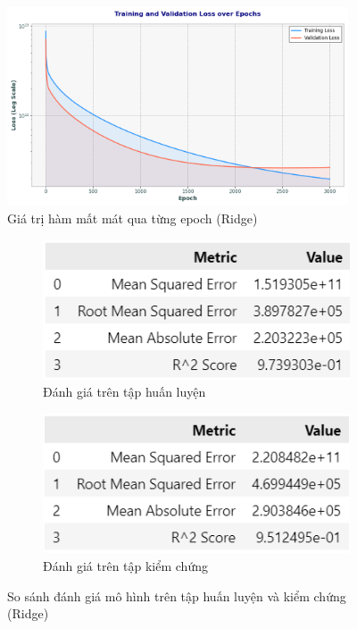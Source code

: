 \begin{figure}[H]
    \centering
    \includegraphics[width=0.9\textwidth]{img_multiple/loss_ridge.png} %
    \caption{Giá trị hàm mất mát qua từng epoch (Ridge)}
    \label{fig:loss_ridge}
\end{figure}

\begin{figure}[H]
    \centering
    \begin{subfigure}[b]{0.48\textwidth}
        \centering
        \includegraphics[width=\linewidth]{img_multiple/metrics_ridge_train.png}
        \caption{Đánh giá trên tập huấn luyện}
    \end{subfigure}
    \hfill
    \begin{subfigure}[b]{0.48\textwidth}
        \centering
        \includegraphics[width=\linewidth]{img_multiple/metrics_ridge_val.png}
        \caption{Đánh giá trên tập kiểm chứng}
    \end{subfigure}
    \caption{So sánh đánh giá mô hình trên tập huấn luyện và kiểm chứng (Ridge)} 
\end{figure}

